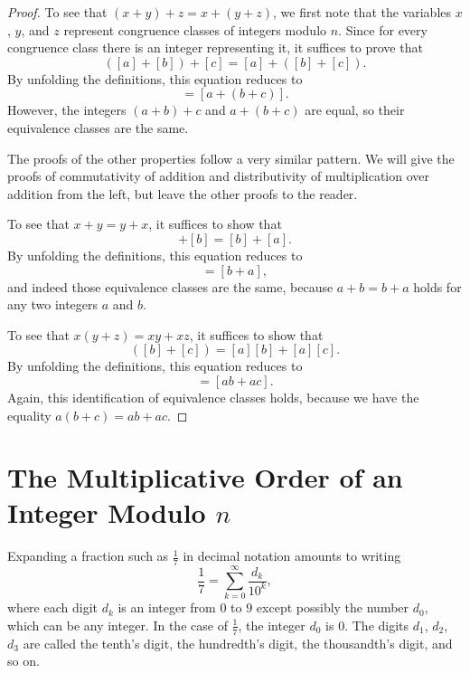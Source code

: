 \begin{proof}
  To see that $(x+y)+z=x+(y+z)$, we first note that the variables $x$, $y$, and $z$ represent congruence classes of integers modulo $n$. Since for every congruence class there is an integer representing it, it suffices to prove that
  \begin{equation*}
    ([a]+[b])+[c]=[a]+([b]+[c]).
  \end{equation*}
  By unfolding the definitions, this equation reduces to
  \begin{equation*}
    [(a+b)+c]=[a+(b+c)].
  \end{equation*}
  However, the integers $(a+b)+c$ and $a+(b+c)$ are equal, so their equivalence classes are the same.

  The proofs of the other properties follow a very similar pattern. We will give the proofs of commutativity of addition and distributivity of multiplication over addition from the left, but leave the other proofs to the reader.

  To see that $x+y=y+x$, it suffices to show that
  \begin{equation*}
    [a]+[b] = [b]+[a].
  \end{equation*}
  By unfolding the definitions, this equation reduces to
  \begin{equation*}
    [a+b]=[b+a],
  \end{equation*}
  and indeed those equivalence classes are the same, because $a+b=b+a$ holds for any two integers $a$ and $b$.

  To see that $x(y+z)=xy+xz$, it suffices to show that
  \begin{equation*}
    [a]([b]+[c]) = [a][b] + [a][c].
  \end{equation*}
  By unfolding the definitions, this equation reduces to
  \begin{equation*}
    [a(b+c)] = [ab+ac].
  \end{equation*}
  Again, this identification of equivalence classes holds, because we have the equality $a(b+c)=ab+ac$.
\end{proof}

\section{The Multiplicative Order of an Integer Modulo $n$}

Expanding a fraction such as $\frac{1}{7}$ in decimal notation amounts to writing
\begin{equation*}
  \frac{1}{7}=\sum_{k=0}^\infty \frac{d_k}{10^k},
\end{equation*}
where each digit $d_k$ is an integer from $0$ to $9$ except possibly the number $d_0$, which can be any integer. In the case of $\frac{1}{7}$, the integer $d_0$ is $0$. The digits $d_1$, $d_2$, $d_3$ are called the tenth's digit, the hundredth's digit, the thousandth's digit, and so on.

